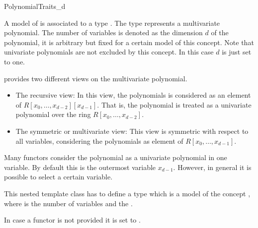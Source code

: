 \begin{ccRefConcept}{PolynomialTraits_d}

\ccDefinition
A model of  is associated to a type 
. 
The type  represents a multivariate polynomial.
The number of variables is denoted as the dimension $d$ of the polynomial,
it is arbitrary but fixed for a certain model of this concept.  
Note that univariate polynomials are not excluded by this concept. In this case 
$d$ is just set to one.  

 provides two different views on the 
multivariate polynomial. 

\begin{itemize}
\item The recursive view:  In this view, the polynomials is considered as 
an element of $R[x_0,\dots,x_{d-2}][x_{d-1}]$. That is, the polynomial 
is treated as a univariate polynomial over the ring $R[x_0,\dots,x_{d-2}]$. 
\item The symmetric or multivariate view: This view is symmetric 
with respect to all variables,
considering the polynomials as element of $R [x_0,\dots,x_{d-1}]$.
\end{itemize}

Many functors consider the polynomial as a univariate polynomial in one variable.
By default this is the outermost variable $x_{d-1}$. However, in general it 
is possible to select a certain variable. 

\ccRefines

\ccConstants
 

\ccTypes

\ccGlue
{}\ccGlue
{}

{This nested template class has to define a type  which is a model 
of the concept , where  is the number of 
variables and  the .}


In case a functor is not provided it is set to .


\end{ccRefConcept}
